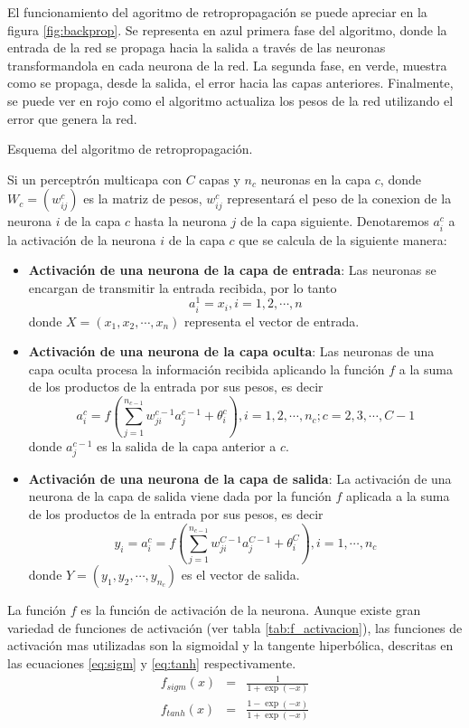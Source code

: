 El funcionamiento del agoritmo de retropropagación se puede apreciar en la figura \ref{fig:backprop}. Se representa en azul primera fase del algoritmo, donde la entrada de la red se propaga hacia la salida a través de las neuronas transformandola en cada neurona de la red. La segunda fase, en verde, muestra como se propaga, desde la salida, el error hacia las capas anteriores. Finalmente, se puede ver en rojo como el algoritmo actualiza los pesos de la red utilizando el error que genera la red.
\begin{imagen}
	\scalebox{1.0}{}
	\caption{Esquema del algoritmo de retropropagación.}
	\label{fig:backprop}
\end{imagen}

Si un perceptrón multicapa con $C$ capas y $n_c$ neuronas en la capa $c$, donde $W_c = (w^{c}_{ij})$ es la matriz de pesos, $w^{c}_{ij}$ representará el peso de la conexion de la neurona $i$ de la capa $c$ hasta la neurona $j$ de la capa siguiente. Denotaremos $a^{c}_{i}$ a la activación de la neurona $i$ de la capa $c$ que se calcula de la siguiente manera:
\begin{itemize}
	\item {\bf Activación de una neurona de la capa de entrada}: Las neuronas se encargan de transmitir la entrada recibida, por lo tanto $$ a^{1}_{i} = x_{i}, i = 1, 2, \cdots, n$$ donde $X = (x_1, x_2, \cdots, x_n)$ representa el vector de entrada.

	\item {\bf Activación de una neurona de la capa oculta}: Las neuronas de una capa oculta procesa la información recibida aplicando la función $f$ a la suma de los productos de la entrada por sus pesos, es decir $$ a^{c}_{i} = f\left(\sum^{n_{c - 1}}_{j=1} w^{c - 1}_{ji}a^{c - 1}_{j} + \theta^{c}_{i}\right), i = 1, 2, \cdots, n_c; c = 2, 3, \cdots, C - 1$$ donde $a^{c - 1}_{j}$ es la salida de la capa anterior a $c$.

	\item {\bf Activación de una neurona de la capa de salida}: La activación de una neurona de la capa de salida viene dada por la función $f$ aplicada a la suma de los productos de la entrada por sus pesos, es decir $$ y_{i} = a^{c}_{i} = f\left(\sum^{n_{c - 1}}_{j=1} w^{C - 1}_{ji}a^{C - 1}_{j} + \theta^{C}_{i}\right), i = 1, \cdots, n_c$$ donde $Y = (y_1, y_2, \cdots, y_{n_{c}})$ es el vector de salida.
\end{itemize}

La función $f$ es la función de activación de la neurona. Aunque existe gran variedad de funciones de activación (ver tabla \ref{tab:f_activacion}), las funciones de activación mas utilizadas son la sigmoidal y la tangente hiperbólica, descritas en las ecuaciones \ref{eq:sigm} y \ref{eq:tanh} respectivamente.
\begin{eqnarray}
	f_{sigm}(x) &=& \frac{1}{1+\exp(-x)}\label{eq:sigm}\\
	f_{tanh}(x) &=& \frac{1 - \exp(-x)}{1 + \exp(-x)}\label{eq:tanh}
\end{eqnarray}

